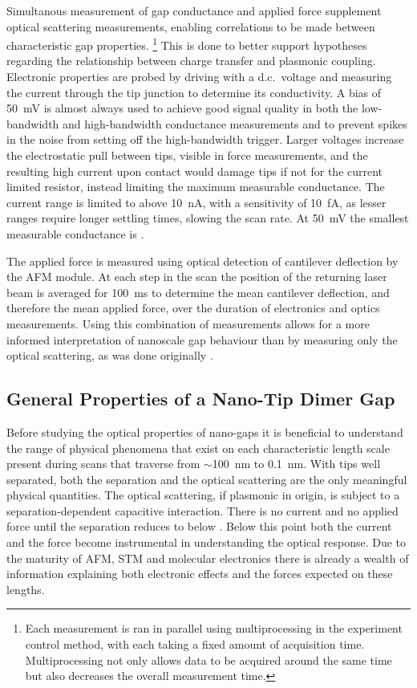 \documentclass[a4paper]{article}
\begin{document}
Simultanous measurement of gap conductance and applied force supplement optical scattering measurements, enabling correlations to be made between characteristic gap properties.%
\footnote{Each measurement is ran in parallel using multiprocessing in the experiment control method, with each taking a fixed amount of acquisition time. Multiprocessing not only allows data to be acquired around the same time but also decreases the overall measurement time.}
This is done to better support hypotheses regarding the relationship between charge transfer and plasmonic coupling.
Electronic properties are probed by driving with a d.c.\ voltage and measuring the current through the tip junction to determine its conductivity. A bias of \SI{50}{mV} is almost always used to achieve good signal quality in both the low-bandwidth and high-bandwidth conductance measurements and to prevent spikes in the noise from setting off the high-bandwidth trigger. Larger voltages increase the electrostatic pull between tips, visible in force measurements, and the resulting high current upon contact would damage tips if not for the current limited resistor, instead limiting the maximum measurable conductance. The current range is limited to above \SI{10}{nA}, with a sensitivity of \SI{10}{fA}, as lesser ranges require longer settling times, slowing the scan rate. At \SI{50}{mV} the smallest measurable conductance is .

The applied force is measured using optical detection of cantilever deflection by the AFM module. At each step in the scan the position of the returning laser beam is averaged for \SI{100}{ms} to determine the mean cantilever deflection, and therefore the mean applied force, over the duration of electronics and optics measurements.%
Using this combination of measurements allows for a more informed interpretation of nanoscale gap behaviour than by measuring only the optical scattering, as was done originally \cite{savage2012}.

\subsection{General Properties of a Nano-Tip Dimer Gap}

Before studying the optical properties of nano-gaps it is beneficial to understand the range of physical phenomena that exist on each characteristic length scale present during scans that traverse from $\sim$\SI{100}{nm} to \SI{0.1}{nm}. With tips well separated, both the separation and the optical scattering are the only meaningful physical quantities. The optical scattering, if plasmonic in origin, is subject to a separation-dependent capacitive interaction. There is no current and no applied force until the separation reduces to below . Below this point both the current and the force become instrumental in understanding the optical response. Due to the maturity of AFM, STM and molecular electronics there is already a wealth of information explaining both electronic effects and the forces expected on these lengths.
\end{document}
